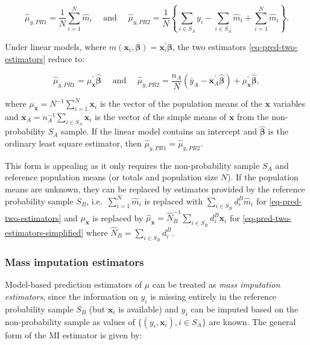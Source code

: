 \documentclass[
]{jss}
\begin{document}
\begin{equation}
\hat{\mu}_{y,PR1}=\frac{1}{N} \sum_{i=1}^N \hat{m}_i \quad \text { and } \quad \hat{\mu}_{y,PR2}=\frac{1}{N}\left\{\sum_{i \in S_A} y_i-\sum_{i \in S_A} \hat{m}_i+\sum_{i=1}^N \hat{m}_i\right\}.
\label{eq-pred-two-estimators}
\end{equation}

Under linear models, where
\(m(\boldsymbol{x}_i, \boldsymbol{\beta})=\boldsymbol{x}_i^{\prime}\boldsymbol{\beta}\),
the two estimators \eqref{eq-pred-two-estimators} reduce to:

\begin{equation}
\hat{\mu}_{y,PR1}=\mu_{\boldsymbol{x}}^{\prime} \hat{\boldsymbol{\beta}} \quad \text { and } \quad \hat{\mu}_{y,PR2}=\frac{n_A}{N}\left(\bar{y}_A-\overline{\boldsymbol{x}}_A^{\prime} \hat{\boldsymbol{\beta}}\right)+\mu_{\boldsymbol{x}}^{\prime} \hat{\boldsymbol{\beta}},
\label{eq-pred-two-estimators-simplified}
\end{equation}

where \(\mu_{\boldsymbol{x}} = N^{-1}\sum_{i=1}^N\boldsymbol{x}_i\) is
the vector of the population means of the \(\boldsymbol{x}\) variables
and
\(\overline{\boldsymbol{x}}_A=n_A^{-1}\sum_{i \in S_A}\boldsymbol{x}_i\)
is the vector of the simple means of \(\boldsymbol{x}\) from the
non-probability \(S_A\) sample. If the linear model contains an
intercept and \(\hat{\boldsymbol{\beta}}\) is the ordinary least square
estimator, then \(\hat{\mu}_{y,PR1}=\hat{\mu}_{y,PR2}\).

This form is appealing as it only requires the non-probability sample
\(S_A\) and reference population means (or totals and population size
\(N\)). If the population means are unknown, they can be replaced by
estimates provided by the reference probability sample \(S_B\),
i.e.~\(\sum_{i=1}^N \hat{m}_i\) is replaced with
\(\sum_{i \in S_B} d_i^B\hat{m}_i\) for \eqref{eq-pred-two-estimators}
and \(\mu_{\boldsymbol{x}}\) is replaced by
\(\hat{\mu}_{\boldsymbol{x}}=\hat{N}_B^{-1}\sum_{i \in S_B}d_i^B\boldsymbol{x}_i\)
for \eqref{eq-pred-two-estimators-simplified} where
\(\hat{N}_B=\sum_{i \in S_B}d_i^B\).

\subsubsection{Mass imputation
estimators}\label{mass-imputation-estimators}

Model-based prediction estimators of \(\mu\) can be treated as
\textit{mass imputation estimators}, since the information on \(y_i\) is
missing entirely in the reference probability sample \(S_B\) (but
\(\boldsymbol{x}_i\) is available) and \(y_i\) can be imputed based on
the non-probability sample as values of
\(\{ (y_i, \boldsymbol{x}_i), i \in S_A\}\) are known. The general form
of the MI estimator is given by:
\end{document}
